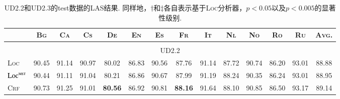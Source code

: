 \begin{table*}[tb]
	\setlength{\tabcolsep}{2.9pt}
	\centering
	\caption{
		UD2.2和UD2.3的test数据的LAS结果.
		同样地，$\dagger$和$\ddagger$各自表示基于\textsc{Loc}分析器，$p<0.05$以及$p<0.005$的显著性级别.
	}
	\begin{tabularx}{\textwidth}{lccccccccccccc}
		\toprule
		                                  & \textsc{Bg}    & \textsc{Ca}    & \textsc{Cs}                      & \textsc{De}                     & \textsc{En}                     & \textsc{Es}                      & \textsc{Fr}                     & \textsc{It}                      & \textsc{Nl}                      & \textsc{No}                     & \textsc{Ro}                      & \textsc{Ru}                      & \textsc{Avg.}                    \\[1pt]
		\midrule
		\\[-15pt]
		\multicolumn{14}{c}{UD2.2}                                                                                                                                                                                                                                                                                                                                                                                                                                       \\[1pt]
		\textsc{Loc}                      & 90.45          & 91.14          & 90.97                            & 80.02                           & 86.83                           & 90.56                            & 87.76                           & 91.14                            & 87.72                            & 90.74                           & 86.20                            & 93.01                            & 88.88                            \\
		$\textsc{Loc}^{\textsc{mst}}$     & 90.44          & 91.11          & 91.04                            & 80.21                           & 86.86                           & 90.67                            & 87.99                           & 91.19                            & 88.24                            & 90.35                           & 86.24                            & 93.01                            & 88.95                            \\
		\textsc{Crf}                      & 90.73          & 91.25          & 91.01                            & \textbf{80.56}\rlap{$^\dagger$} & 86.92                           & 90.81\rlap{$^\dagger$}           & \textbf{88.16}                  & 91.64\rlap{$^\dagger$}           & 88.10                            & 90.85                           & 86.50                            & 93.17\rlap{$^\dagger$}           & 89.14\rlap{$^\ddagger$}          \\

\end{tabularx}
\end{table*}

